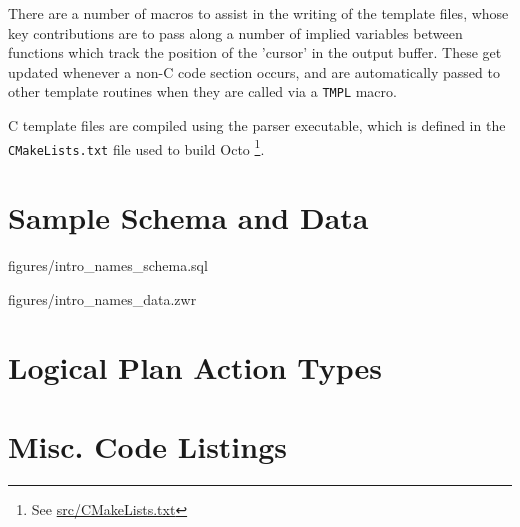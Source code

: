 \documentclass[]{article}
\def\code#1{\texttt{#1}}
\newcommand{\gitlab}[1]{\footnote{See \href{https://gitlab.com/YottaDB/DBMS/YDBOcto/blob/master/#1}{#1}}}
\begin{document}
There are a number of macros to assist in the writing of the template files, whose key contributions are to pass along a number of implied variables between functions which track the position of the 'cursor' in the output buffer.
These get updated whenever a non-C code section occurs, and are automatically passed to other template routines when they are called via a \code{TMPL} macro.

C template files are compiled using the parser executable, which is defined in the \code{CMakeLists.txt} file used to build Octo \gitlab{src/CMakeLists.txt}.

\appendix
\appendixpage
\addappheadtotoc

\section{Sample Schema and Data}


{figures/intro_names_schema.sql}


{figures/intro_names_data.zwr}

\section{Logical Plan Action Types}



\section{Misc. Code Listings}





\end{document}
